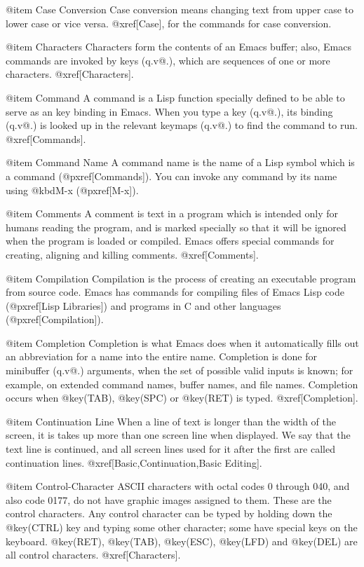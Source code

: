 @item Case Conversion
Case conversion means changing text from upper case to lower case or
vice versa.  @xref[Case], for the commands for case conversion.

@item Characters
Characters form the contents of an Emacs buffer; also, Emacs commands are
invoked by keys (q.v@.), which are sequences of one or more characters.
@xref[Characters].

@item Command
A command is a Lisp function specially defined to be able to serve as an
key binding in Emacs.  When you type a key (q.v@.), its binding (q.v@.) is
looked up in the relevant keymaps (q.v@.) to find the command to run.
@xref[Commands].

@item Command Name
A command name is the name of a Lisp symbol which is a command
(@pxref[Commands]).  You can invoke any command by its name using
@kbd{M-x} (@pxref[M-x]).

@item Comments
A comment is text in a program which is intended only for humans reading
the program, and is marked specially so that it will be ignored when the
program is loaded or compiled.  Emacs offers special commands for creating,
aligning and killing comments.  @xref[Comments].

@item Compilation
Compilation is the process of creating an executable program from source code.
Emacs has commands for compiling files of Emacs Lisp code (@pxref[Lisp
Libraries]) and programs in C and other languages (@pxref[Compilation]).

@item Completion
Completion is what Emacs does when it automatically fills out an
abbreviation for a name into the entire name.  Completion is done
for minibuffer (q.v@.) arguments, when the set of possible valid inputs is
known; for example, on extended command names, buffer names, and file
names.  Completion occurs when @key(TAB), @key(SPC) or @key(RET) is
typed.  @xref[Completion].

@item Continuation Line
When a line of text is longer than the width of the screen, it is takes up
more than one screen line when displayed.  We say that the text line is
continued, and all screen lines used for it after the first are called
continuation lines.  @xref[Basic,Continuation,Basic Editing].

@item Control-Character
ASCII characters with octal codes 0 through 040, and also code 0177, do
not have graphic images assigned to them.  These are the control
characters.  Any control character can be typed by holding down the
@key(CTRL) key and typing some other character; some have special keys on
the keyboard.  @key(RET), @key(TAB), @key(ESC), @key(LFD) and @key(DEL)
are all control characters.  @xref[Characters].

